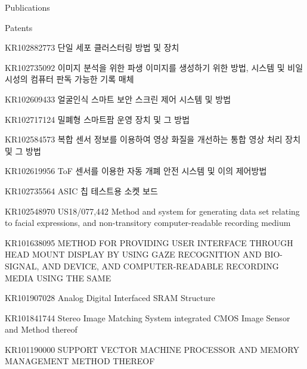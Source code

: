 \documentclass{resume} %
\newcommand{\ko}[1]{{\upshape\koreanfont #1}}
\begin{document}
\begin{section}{Publications}
\begin{subsection}{Patents}{}{}{}
\item {\small KR102882773 \ko{단일 세포 클러스터링 방법 및 장치}} 

\item {\small KR102735092 \ko{이미지 분석을 위한 파생 이미지를 생성하기 위한 방법, 시스템 및 비일시성의 컴퓨터 판독 가능한 기록 매체}} 

\item {\small KR102609433 \ko{얼굴인식 스마트 보안 스크린 제어 시스템 및 방법}} 

\item {\small KR102717124 \ko{밀폐형 스마트팜 운영 장치 및 그 방법}} 

\item {\small KR102584573 \ko{복합 센서 정보를 이용하여 영상 화질을 개선하는 통합 영상 처리 장치 및 그 방법}} 

\item {\small KR102619956 ToF \ko{센서를 이용한 자동 개폐 안전 시스템 및 이의 제어방법}} 

\item {\small KR102735564 ASIC \ko{칩 테스트용 소켓 보드}} 

\item {\small KR102548970 US18/077,442 Method and system for generating data set relating to facial expressions, and non-transitory computer-readable recording medium} 

\item {\small KR101638095 METHOD FOR PROVIDING USER INTERFACE THROUGH HEAD MOUNT DISPLAY BY USING GAZE RECOGNITION AND BIO-SIGNAL, AND DEVICE, AND COMPUTER-READABLE RECORDING MEDIA USING THE SAME}

\item {\small KR101907028 Analog Digital Interfaced SRAM Structure}

\item {\small KR101841744 Stereo Image Matching System integrated CMOS Image Sensor and Method thereof}

\item {\small KR101190000 SUPPORT VECTOR MACHINE PROCESSOR AND MEMORY MANAGEMENT METHOD THEREOF}

\end{subsection}

\end{section}



\end{document}
